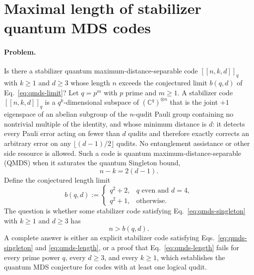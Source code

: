 \section{Maximal length of stabilizer quantum MDS codes}
\label{sec:op_2a6fc2b70a85f846}

\paragraph{Problem.}
Is there a stabilizer quantum maximum-distance-separable code $[[n,k,d]]_q$
with $k\geq1$ and $d\geq3$ whose length $n$ exceeds the conjectured limit
$b(q,d)$ of Eq.~\eqref{eq:qmds-limit}?  Let $q=p^{m}$ with $p$ prime and
$m\geq1$.  A stabilizer code $[[n,k,d]]_q$ is a $q^{k}$-dimensional subspace
of $(\mathbb{C}^{q})^{\otimes n}$ that is the joint $+1$ eigenspace of an
abelian subgroup of the $n$-qudit Pauli group containing no nontrivial
multiple of the identity, and whose minimum distance is $d$: it detects
every Pauli error acting on fewer than $d$ qudits and therefore exactly
corrects an arbitrary error on any $\lfloor(d-1)/2\rfloor$ qudits.  No
entanglement assistance or other side resource is allowed.  Such a code is
quantum maximum-distance-separable (QMDS) when it saturates the quantum
Singleton bound,
\begin{equation}
  n-k=2(d-1).
  \label{eq:qmds-singleton}
\end{equation}
Define the conjectured length limit
\begin{equation}
  b(q,d):=
  \begin{cases}
    q^{2}+2, & q\text{ even and }d=4,\\
    q^{2}+1, & \text{otherwise}.
  \end{cases}
  \label{eq:qmds-limit}
\end{equation}
The question is whether some stabilizer code satisfying
Eq.~\eqref{eq:qmds-singleton} with $k\geq1$ and $d\geq3$ has
\begin{equation}
  n>b(q,d).
  \label{eq:qmds-length}
\end{equation}
A complete answer is either an explicit stabilizer code satisfying
Eqs.~\eqref{eq:qmds-singleton} and \eqref{eq:qmds-length}, or a proof that
Eq.~\eqref{eq:qmds-length} fails for every prime power $q$, every $d\geq3$,
and every $k\geq1$, which establishes the quantum MDS conjecture for codes
with at least one logical qudit.

